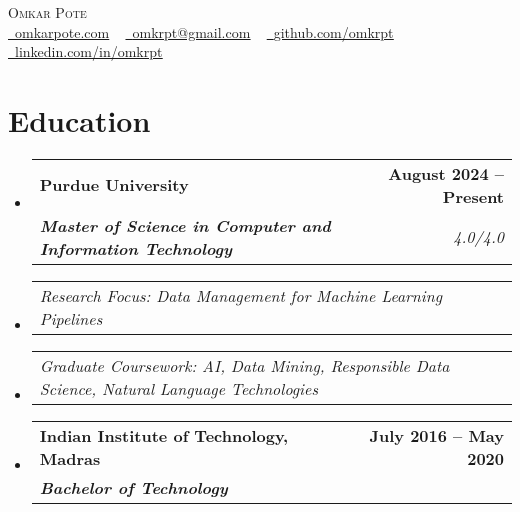 \documentclass[letterpaper,11pt]{article}
\makeatletter
\newcommand{\resumeSubheading}[4]{
  \vspace{-2pt}\item
    \begin{tabular*}{1.0\textwidth}[t]{l@{\extracolsep{\fill}}r}
      \textbf{#1} & \textbf{\small #2} \\
      \textit{\small#3} & \textit{\small #4} \\
    \end{tabular*}\vspace{-7pt}
}
\newcommand{\resumeSubSubheading}[2]{
    \item
    \begin{tabular*}{1.0\textwidth}{l@{\extracolsep{\fill}}r}
      \textit{\small#1} & \textit{\small #2} \\
    \end{tabular*}\vspace{-7pt}
}
\newcommand{\resumeSubHeadingListStart}{\begin{itemize}[leftmargin=0.0in, label={}]}
\newcommand{\resumeSubHeadingListEnd}{\end{itemize}}
\makeatother
\begin{document}

\begin{center}
    {\vspace*{30pt} \Huge \scshape Omkar Pote} \\ \vspace{5pt} 
    \small
    \href{https://omkarpote.com}{\raisebox{-0.2\height}\faGlobe\  \underline{omkarpote.com}} ~ 
    \href{mailto:omkrpt@gmail.com}{\raisebox{-0.2\height}\faEnvelope\  \underline{omkrpt@gmail.com}} ~
    \href{https://github.com/omkrpt}{\raisebox{-0.2\height}\faGithub\ \underline{github.com/omkrpt}} ~ 
    \href{https://linkedin.com/in/omkrpt/}{\raisebox{-0.2\height}\faLinkedin\ \underline{linkedin.com/in/omkrpt}}
    \vspace{-8pt}
\end{center}


\section{Education}
  \resumeSubHeadingListStart
    \resumeSubheading
      {Purdue University}{August 2024 -- Present}
      {\textbf{Master of Science in Computer and Information Technology}}{4.0/4.0}
      \vspace{-8pt}
      \resumeSubSubheading
      {Research Focus: Data Management for Machine Learning Pipelines}{}
      \vspace{-18pt}
      \resumeSubSubheading
      {Graduate Coursework: AI, Data Mining, Responsible Data Science, Natural Language Technologies}{}  
      \vspace{-8pt}
    \resumeSubheading
      {Indian Institute of Technology, Madras}{July 2016 -- May 2020}
      {\textbf{Bachelor of Technology}}{}
  \resumeSubHeadingListEnd

\end{document}
